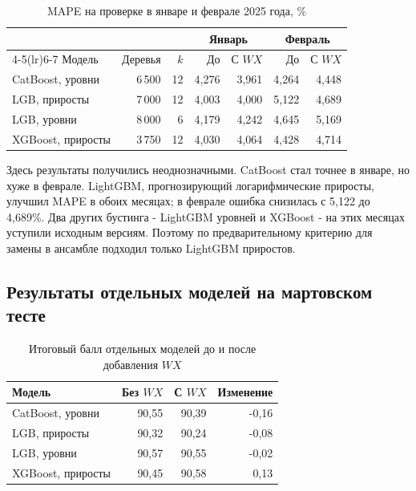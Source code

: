 \documentclass[12pt, a4paper]{article}
\newcommand{\tablesource}[1]{\par\vspace{1mm}{\footnotesize Источник: #1.}}
\begin{document}
\begin{table}[H]
\centering
\footnotesize
\setlength{\tabcolsep}{4pt}
\caption{MAPE на проверке в январе и феврале 2025 года, \%}
\begin{tabularx}{\textwidth}{Xrrrrrr}\toprule
& & & \multicolumn{2}{c}{Январь} & \multicolumn{2}{c}{Февраль}\\
\cmidrule(lr){4-5}\cmidrule(lr){6-7}
Модель & Деревья & $k$ & До & С $WX$ & До & С $WX$\\\midrule
CatBoost, уровни & 6\,500 & 12 & 4,276 & 3,961 & 4,264 & 4,448 \\
LGB, приросты & 7\,000 & 12 & 4,003 & 4,000 & 5,122 & 4,689 \\
LGB, уровни & 8\,000 & 6 & 4,179 & 4,242 & 4,645 & 5,169 \\
XGBoost, приросты & 3\,750 & 12 & 4,030 & 4,064 & 4,428 & 4,714 \\
\bottomrule\end{tabularx}
\tablesource{расчеты авторов по данным X5 Group и GeoNames}
\end{table}

Здесь результаты получились неоднозначными. CatBoost стал точнее в январе, но хуже в феврале.
LightGBM, прогнозирующий логарифмические приросты, улучшил MAPE в обоих месяцах; в феврале ошибка снизилась с 5,122 до 4,689\%.
Два других бустинга - LightGBM уровней и XGBoost - на этих месяцах уступили исходным версиям.
Поэтому по предварительному критерию для замены в ансамбле подходил только LightGBM приростов.

\subsection*{Результаты отдельных моделей на мартовском тесте}

\begin{table}[H]
\centering
\footnotesize
\caption{Итоговый балл отдельных моделей до и после добавления $WX$}
\begin{tabularx}{\textwidth}{Xrrr}\toprule
Модель & Без $WX$ & С $WX$ & Изменение\\\midrule
CatBoost, уровни & 90,55 & 90,39 & -0,16 \\
LGB, приросты & 90,32 & 90,24 & -0,08 \\
LGB, уровни & 90,57 & 90,55 & -0,02 \\
XGBoost, приросты & 90,45 & 90,58 & 0,13 \\
\bottomrule\end{tabularx}
\tablesource{расчеты авторов по данным X5 Group и GeoNames}
\end{table}
\end{document}
